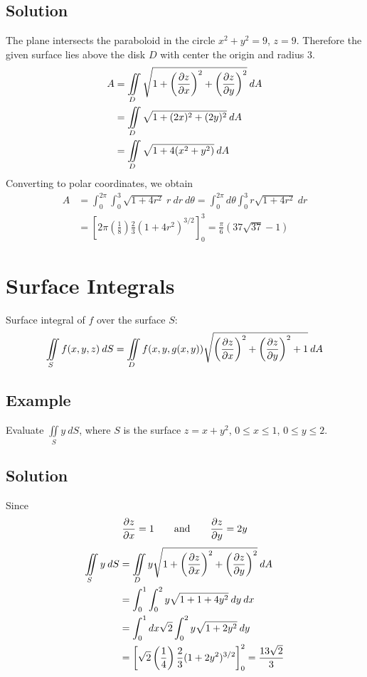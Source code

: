 \subsection*{Solution}
The plane intersects the paraboloid in the circle $x^2+y^2=9$, $z=9$. Therefore the
given surface lies above the disk $D$ with center the origin and radius 3.
\begin{align*}
        A & =\iint\limits_D \sqrt{1+\left(\pdv{z}{x}\right)^2+\left(\pdv{z}{y}\right)^2}\:dA \\
          & =\iint\limits_D\sqrt{1+(2x)^2+(2y)^2}\:dA                                        \\
          & =\iint\limits_D\sqrt{1+4(x^2+y^2)}\:dA
\end{align*}
Converting to polar coordinates, we obtain
\begin{align*}
        A & =\int_0^{2\pi}\int_0^3 \sqrt{1+4r^2}\:r\:dr\:d\theta=\int_0^{2\pi}d\theta\int_0^3r\sqrt{1+4r^2}\:dr  \\
          & =\left[2\pi\left(\frac{1}{8}\right)\frac{2}{3}(1+4r^2)^{3/2}\right]_0^3=\frac{\pi}{6}(37\sqrt{37}-1)
\end{align*}

\section{Surface Integrals}
Surface integral of $f$ over the surface $S$:
$$\iint\limits_S f(x,y,z)\:dS=\iint\limits_D f(x,y,g(x,y))\sqrt{\left(\pdv{z}{x}\right)^2+
                \left(\pdv{z}{y}\right)^2+1}\:dA$$

\subsection*{Example}
Evaluate $\iint\limits_S y\:dS$, where $S$ is the surface $z=x+y^2$, $0\leq x\leq 1$,
$0\leq y\leq 2$.

\subsection*{Solution}
Since
$$\pdv{z}{x}=1 \qquad \text{and} \qquad \pdv{z}{y}=2y$$
\begin{align*}
        \iint\limits_S y\:dS & =\iint\limits_D y\sqrt{1+\left(\pdv{z}{x}\right)^2+\left(\pdv{z}{y}\right)^2}\:dA                \\
                             & =\int_0^1\int_0^2 y\sqrt{1+1+4y^2}\:dy\:dx                                                       \\
                             & =\int_0^1 dx\sqrt{2}\int_0^2 y\sqrt{1+2y^2}\: dy                                                 \\
                             & =\left[\sqrt{2}\left(\frac{1}{4}\right)\frac{2}{3}(1+2y^2)^{3/2}\right]_0^2=\frac{13\sqrt{2}}{3}
\end{align*}

